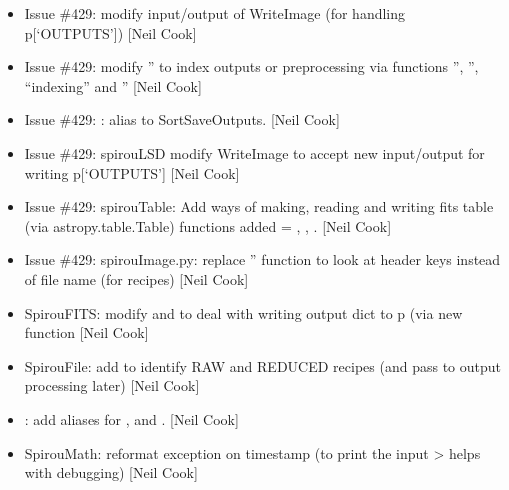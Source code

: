 \documentclass[a4paper,10pt,english]{report}
\begin{document}
\begin{itemize}
\item {} 
Issue \#429:  \sphinxhyphen{} modify input/output of WriteImage (for
handling p{[}‘OUTPUTS’{]}) {[}Neil Cook{]}

\item {} 
Issue \#429:  modify ” to index outputs
or pre\sphinxhyphen{}processing \sphinxhyphen{} via functions ”, ”,
“indexing” and ” {[}Neil Cook{]}

\item {} 
Issue \#429: : alias  to
SortSaveOutputs. {[}Neil Cook{]}

\item {} 
Issue \#429: spirouLSD \sphinxhyphen{} modify WriteImage to accept new input/output
for writing p{[}‘OUTPUTS’{]} {[}Neil Cook{]}

\item {} 
Issue \#429: spirouTable: Add ways of making, reading and writing fits
table (via astropy.table.Table) \sphinxhyphen{} functions added = ,
, . {[}Neil Cook{]}

\item {} 
Issue \#429: spirouImage.py: replace ” function
to look at header keys instead of file name (for  recipes)
{[}Neil Cook{]}

\item {} 
SpirouFITS: modify  and  to deal with
writing output dict to p (via new function  {[}Neil
Cook{]}

\item {} 
SpirouFile: add  to identify RAW and REDUCED recipes (and pass
to output processing later) {[}Neil Cook{]}

\item {} 
: add aliases for , 
and . {[}Neil Cook{]}

\item {} 
SpirouMath: reformat exception on timestamp (to print the input \textendash{}\textgreater{}
helps with debugging) {[}Neil Cook{]}


\end{itemize}
\end{document}
